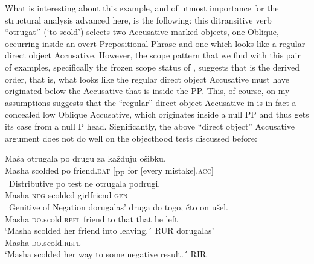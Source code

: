 \documentclass[output=paper,colorlinks,citecolor=brown,nonflat]{./langscibook}
\begin{document}
What is interesting about this example, and of utmost importance for the structural analysis advanced here, is the following: this ditransitive verb “otrugat’’ (‘to scold’) selects two Accusative-marked objects, one Oblique, occurring inside an overt Prepositional Phrase and one which looks like a regular direct object Accusative. However, the scope pattern that we find with this pair of examples, specifically the frozen scope status of , suggests that  is the {derived} order, that is, what looks like the regular direct object Accusative must have originated below the Accusative that is inside the PP. This, of course, on my assumptions suggests that the “regular” direct object Accusative in  is in fact a concealed low Oblique Accusative, which originates inside a null PP and thus gets its case from a null P head. Significantly, the above “direct object” Accusative argument does not do well on the objecthood tests discussed before:


\ea%
    \label{ex:antonyuk:55}
    \ea \label{ex:antonyuk:55a}
    \gll {*} {Maša}  {otrugala} {po} {drugu} {} {za} {každuju}             {ošibku}.\\
    { } Masha scolded  po friend.\textsc{dat} [\textsubscript{PP} for [every mistake].\textsc{acc}]\\
    \glt ~\hfill{Distributive po test}
    \ex \label{ex:antonyuk:55b}
        {ne}    {otrugala} {podrugi}.\\
    Masha \textsc{neg} scolded   girlfriend-\textsc{gen}\\
    \glt ~\hfill{Genitive of Negation}
    \ex \label{ex:antonyuk:55c}
        {dorugalas’}         {druga} {do} {togo,} {čto}  {on} {ušel}.\\
    Masha  \textsc{do}.scold.\textsc{refl} friend to  that  that  he left\\
    \glt `Masha scolded her friend into leaving.´ \hfill{RUR}
    \ex \label{ex:antonyuk:55d}
        {dorugalas’}\\
    Masha  \textsc{do}.scold.\textsc{refl}\\
    \glt `Masha scolded her way to some negative result.´ \hfill{RIR} \citep{Tatevosov2010}
    \z
\z
\end{document}
